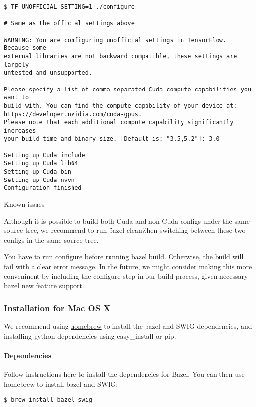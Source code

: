 \begin{lstlisting}
$ TF_UNOFFICIAL_SETTING=1 ./configure

# Same as the official settings above

WARNING: You are configuring unofficial settings in TensorFlow. Because some
external libraries are not backward compatible, these settings are largely
untested and unsupported.

Please specify a list of comma-separated Cuda compute capabilities you want to
build with. You can find the compute capability of your device at:
https://developer.nvidia.com/cuda-gpus.
Please note that each additional compute capability significantly increases
your build time and binary size. [Default is: "3.5,5.2"]: 3.0

Setting up Cuda include
Setting up Cuda lib64
Setting up Cuda bin
Setting up Cuda nvvm
Configuration finished
\end{lstlisting}

Known issues

Although it is possible to build both Cuda and non-Cuda configs under the same source tree, we recommend to run \"bazel clean\" when switching between these two configs in the same source tree.

You have to run configure before running bazel build. Otherwise, the build will fail with a clear error message. In the future, we might consider making this more conveninent by including the configure step in our build process, given necessary bazel new feature support.


\subsubsection {Installation for Mac OS X}

We recommend using \href{http://brew.sh/}{homebrew} to install the bazel and SWIG dependencies, and installing python dependencies using easy_install or pip.

\paragraph{Dependencies}

Follow instructions here to install the dependencies for Bazel. You can then use homebrew to install bazel and SWIG:

\begin{lstlisting}
$ brew install bazel swig
\end{lstlisting}

